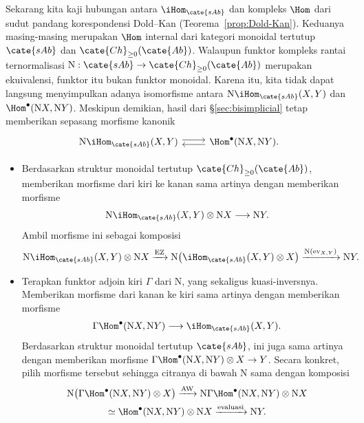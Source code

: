 Sekarang kita kaji hubungan antara $\iHom_{\cate{sAb}}$ dan kompleks $\Hom$
dari sudut pandang korespondensi Dold--Kan
(Teorema~\ref{prop:Dold-Kan}). Keduanya masing-masing merupakan $\Hom$
internal dari kategori monoidal tertutup $\cate{sAb}$ dan
$\cate{Ch}_{\geq0}(\cate{Ab})$. Walaupun funktor kompleks rantai
ternormalisasi
$\mathrm{N}:\cate{sAb}\to\cate{Ch}_{\geq0}(\cate{Ab})$ merupakan
ekuivalensi, funktor itu bukan funktor monoidal. Karena itu, kita tidak dapat
langsung menyimpulkan adanya isomorfisme antara
$\mathrm{N}\iHom_{\cate{sAb}}(X,Y)$ dan
$\Hom^\bullet(\mathrm{N}X,\mathrm{N}Y)$. Meskipun demikian, hasil dari
\S\ref{sec:bisimplicial} tetap memberikan sepasang morfisme kanonik
\begin{equation}\label{eqn:Hom-N}
\begin{tikzcd}
	\mathrm{N}\iHom_{\cate{sAb}}(X,Y)\arrow[shift left,r]
	&\Hom^\bullet(\mathrm{N}X,\mathrm{N}Y).\arrow[shift left,l]
\end{tikzcd}
\end{equation}
\begin{itemize}
	\item Berdasarkan struktur monoidal tertutup
	$\cate{Ch}_{\geq0}(\cate{Ab})$, memberikan morfisme dari kiri ke kanan
	sama artinya dengan memberikan morfisme
	\[
	\mathrm{N}\iHom_{\cate{sAb}}(X,Y)\otimes\mathrm{N}X
	\longrightarrow\mathrm{N}Y.
	\]
	Ambil morfisme ini sebagai komposisi
	\[
	\mathrm{N}\iHom_{\cate{sAb}}(X,Y)\otimes\mathrm{N}X
	\xrightarrow{\mathrm{EZ}}
	\mathrm{N}\bigl(\iHom_{\cate{sAb}}(X,Y)\otimes X\bigr)
	\xrightarrow{\mathrm{N}(\mathrm{ev}_{X,Y})}\mathrm{N}Y.
	\]
	\item Terapkan funktor adjoin kiri $\Gamma$ dari $\mathrm{N}$, yang sekaligus
	kuasi-inversnya. Memberikan morfisme dari kanan ke kiri sama artinya dengan
	memberikan morfisme
	\[
	\Gamma\Hom^\bullet(\mathrm{N}X,\mathrm{N}Y)
	\longrightarrow\iHom_{\cate{sAb}}(X,Y).
	\]
	Berdasarkan struktur monoidal tertutup $\cate{sAb}$, ini juga sama artinya
	dengan memberikan morfisme
	$\Gamma\Hom^\bullet(\mathrm{N}X,\mathrm{N}Y)\otimes X\to Y$.
	Secara konkret, pilih morfisme tersebut sehingga citranya di bawah
	$\mathrm{N}$ sama dengan komposisi
	\begin{multline*}
		\mathrm{N}\bigl(\Gamma\Hom^\bullet(\mathrm{N}X,\mathrm{N}Y)
		\otimes X\bigr)
		\xrightarrow{\mathrm{AW}}
		\mathrm{N}\Gamma\Hom^\bullet(\mathrm{N}X,\mathrm{N}Y)
		\otimes\mathrm{N}X\\
		\simeq\Hom^\bullet(\mathrm{N}X,\mathrm{N}Y)\otimes\mathrm{N}X
		\xrightarrow{\text{evaluasi}}\mathrm{N}Y.
	\end{multline*}
\end{itemize}

